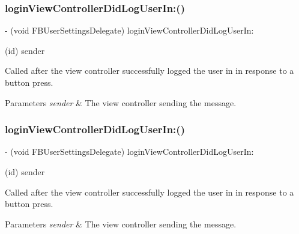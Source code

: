 \subsubsection{\texorpdfstring{login\+View\+Controller\+Did\+Log\+User\+In\+:()}{loginViewControllerDidLogUserIn:()}\hspace{0.1cm}{\footnotesize\ttfamily [4/5]}}
{\footnotesize\ttfamily -\/ (void F\+B\+User\+Settings\+Delegate) login\+View\+Controller\+Did\+Log\+User\+In\+: \begin{DoxyParamCaption}\item[{(id)}]{sender }\end{DoxyParamCaption}\hspace{0.3cm}{\ttfamily [optional]}}

Called after the view controller successfully logged the user in in response to a button press.


\begin{DoxyParams}{Parameters}
{\em sender} & The view controller sending the message. \\
\hline
\end{DoxyParams}
\mbox{\label{protocolFBUserSettingsDelegate_01-p_a66711ccf72e173107d8be71887034d05}} 
\subsubsection{\texorpdfstring{login\+View\+Controller\+Did\+Log\+User\+In\+:()}{loginViewControllerDidLogUserIn:()}\hspace{0.1cm}{\footnotesize\ttfamily [5/5]}}
{\footnotesize\ttfamily -\/ (void F\+B\+User\+Settings\+Delegate) login\+View\+Controller\+Did\+Log\+User\+In\+: \begin{DoxyParamCaption}\item[{(id)}]{sender }\end{DoxyParamCaption}\hspace{0.3cm}{\ttfamily [optional]}}

Called after the view controller successfully logged the user in in response to a button press.


\begin{DoxyParams}{Parameters}
{\em sender} & The view controller sending the message. \\
\hline
\end{DoxyParams}
\mbox{\label{protocolFBUserSettingsDelegate_01-p_a6e8b97e1802353fbbc0c5058189a3f79}} 
